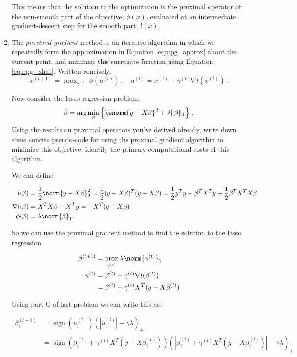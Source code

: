 \documentclass{article}
\DeclareMathOperator*{\sign}{sign}
\DeclareMathOperator*{\prox}{prox}
\begin{document}
\begin{enumerate}[label=(\Alph*)]
{This means that the solution to the optimization is the proximal operator of the non-smooth part of the objective, $\phi(x)$, evaluated at an intermediate gradient-descent step for the smooth part, $l(x)$.

}





\item The \textit{proximal gradient} method is an iterative algorithm in which we repeatedly form the approximation in Equation \ref{eqn:pg_approx} about the current point, and minimize this surrogate function using Equation \ref{eqn:pg_xhat}.  Written concisely,
$$
x^{(t+1)} = \prox_{\gamma^{(t)}} \phi(u^{(t)}) \, , \quad u^{(t)} = x^{(t)} - \gamma^{(t)} \nabla l(x^{(t)}) \, .
$$

Now consider the lasso regression problem:
$$
\hat{\beta} = \arg \min_{\beta} \left\{  \enorm{y - X\beta}^2 + \lambda \Vert \beta \Vert_1 \right\} \, .
$$
Using the results on proximal operators you've derived already, write down some concise pseudo-code for using the proximal gradient algorithm to minimize this objective.  Identify the primary computational costs of this algorithm.

\bigskip
{\color{blue}
We can define 

\begin{align}
l(\beta) &= \frac{1}{2}\norm{y - X\beta}^2_2 = \frac{1}{2}(y - X\beta)^T (y - X\beta) = \frac{1}{2}y^Ty - \beta^T X^T y + \frac{1}{2} \beta^T X^T X \beta \\
\nabla l(\beta) &= X^T X \beta -  X^T y = -X^T(y - X\beta) \\
\phi(\beta) &= \lambda \norm{\beta}_1.
\end{align}

So we can use the proximal gradient method to find the solution to the lasso regression:

\begin{align}
	\beta^{(t+1)} &= \prox_{\gamma^{(t)}} \lambda \norm{u^{(t)}}_1 \\
	u^{(t)} &= \beta^{(t)} - \gamma^{(t)} \nabla l(\beta^{(t)}) \\
	&= \beta^{(t)} + \gamma^{(t)} X^T(y - X\beta^{(t)})
\end{align}

Using part C of last problem we can write this as:

\begin{align}
		\beta^{(t+1)}_i &= \sign(u_i^{(t)})(|u_i^{(t)}| - \gamma \lambda)_+ \\
		&=  \sign(\beta_i^{(t)} + \gamma^{(t)} X^T(y - X\beta_i^{(t)}))(|\beta_i^{(t)} + \gamma^{(t)} X^T(y - X\beta^{(t)}_i)| - \gamma \lambda)_+ 
\end{align}

}
\end{enumerate}
\end{document}
